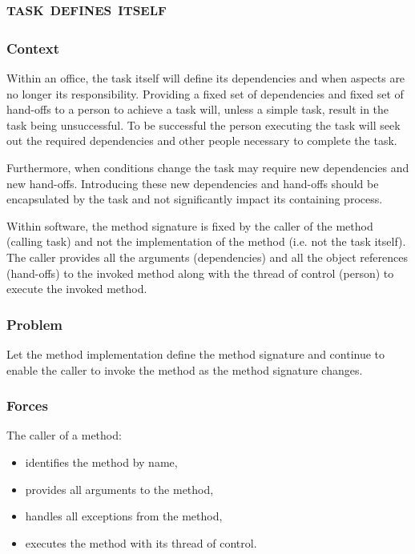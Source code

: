 \documentclass[prodmode]{style/acmlarge}
\begin{document}
\subsection{\textsc{\textbf{task defines itself}}}

\subsubsection*{Context} Within an office, the task itself will define its
dependencies and when aspects are no longer its responsibility.  Providing a
fixed set of dependencies and fixed set of hand-offs to a person to achieve a
task will, unless a simple task, result in the task being unsuccessful.  To
be successful the person executing the task will seek out the required
dependencies and other people necessary to complete the task.

Furthermore, when conditions change the task may require new dependencies and
new hand-offs.  Introducing these new dependencies and hand-offs should be
encapsulated by the task and not significantly impact its containing process.

Within software, the method signature is fixed by the caller of the method
(calling task) and not the implementation of the method (i.e. not the task
itself).  The caller provides all the arguments (dependencies) and all the
object references (hand-offs) to the invoked method along with the thread of
control (person) to execute the invoked method.

\subsubsection*{\textbf{Problem}} Let the method implementation define the method
signature and continue to enable the caller to invoke the method as the method
signature changes.

\subsubsection*{Forces} The caller of a method:
\begin{itemize}
  \item identifies the method by name,
  \item provides all arguments to the method,
  \item handles all exceptions from the method,
  \item executes the method with its thread of control.
\end{itemize}
\end{document}
